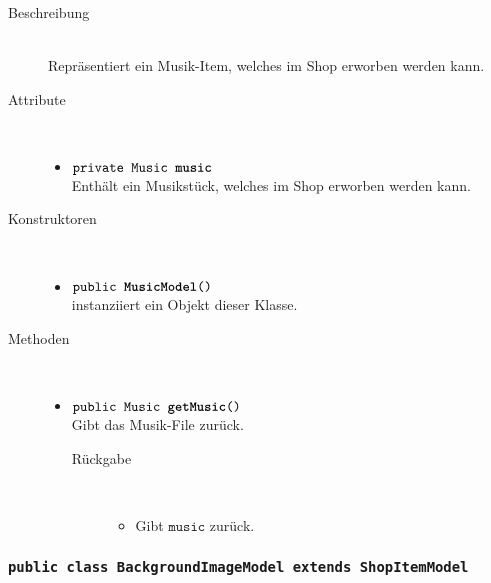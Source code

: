 \begin{description}
\item[Beschreibung] \hfill \\ Repräsentiert ein Musik-Item, welches im Shop erworben werden kann.

\item[Attribute] \hfill \\
	\vspace{-.8cm}
	\begin{itemize}
		\item $\texttt{private Music \textbf{music}}$ \\ Enthält ein Musikstück, welches im Shop erworben werden kann.

		\end{itemize}
	
\item[Konstruktoren] \hfill \\
	\vspace{-.8cm}
	\begin{itemize}
		\item $\texttt{public \textbf{MusicModel}()}$ \\ instanziiert ein Objekt dieser Klasse.

	\end{itemize}
	
\item[Methoden] \hfill \\
	\vspace{-.8cm}
	\begin{itemize}
		\item $\texttt{public Music \textbf{getMusic}()}$ \\ Gibt das Musik-File zurück.
		\begin{description}
			\item[Rückgabe] \hfill \\
			\vspace{-.8cm}
			\begin{itemize}
				\item Gibt $\texttt{music}$ zurück.
			\end{itemize}
			\end{description}
		
	\end{itemize}
\end{description}

\subsubsection{\normalfont \texttt{public class \textbf{BackgroundImageModel} extends ShopItemModel}}

